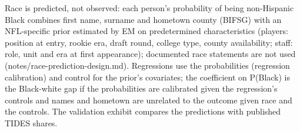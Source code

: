 \begin{table}[!h]
{\begin{threeparttable}
\begin{tablenotes}[para]
Race is predicted, not observed: each person's probability of being non-Hispanic Black combines first name, surname and hometown county (BIFSG) with an NFL-specific prior estimated by EM on predetermined characteristics (players: position at entry, rookie era, draft round, college type, county availability; staff: role, unit and era at first appearance); documented race statements are not used (notes/race-prediction-design.md). Regressions use the probabilities (regression calibration) and control for the prior's covariates; the coefficient on P(Black) is the Black-white gap if the probabilities are calibrated given the regression's controls and names and hometown are unrelated to the outcome given race and the controls. The validation exhibit compares the predictions with published TIDES shares.
\end{tablenotes}
\end{threeparttable}}
\end{table}
